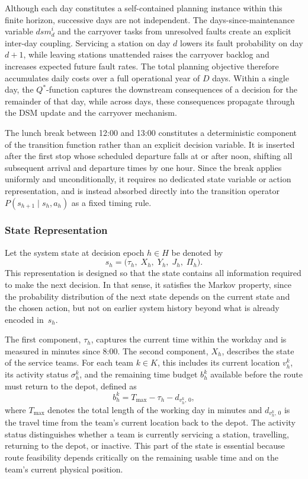 \documentclass[12pt,oneside]{article}
\begin{document}
Although each day constitutes a self-contained planning instance within this finite horizon, successive days are not independent. The days-since-maintenance variable $\mathit{dsm}_d^i$ and the carryover tasks from unresolved faults create an explicit inter-day coupling. Servicing a station on day $d$ lowers its fault probability on day $d+1$, while leaving stations unattended raises the carryover backlog and increases expected future fault rates. The total planning objective therefore accumulates daily costs over a full operational year of $D$ days. Within a single day, the $Q^*$-function captures the downstream consequences of a decision for the remainder of that day, while across days, these consequences propagate through the DSM update and the carryover mechanism.

The lunch break between 12:00 and 13:00 constitutes a deterministic component of the transition function rather than an explicit decision variable. It is inserted after the first stop whose scheduled departure falls at or after noon, shifting all subsequent arrival and departure times by one hour. Since the break applies uniformly and unconditionally, it requires no dedicated state variable or action representation, and is instead absorbed directly into the transition operator $P(s_{h+1} \mid s_h, a_h)$ as a fixed timing rule.
\subsubsection{State Representation}
Let the system state at decision epoch $h \in H$ be denoted by
\[
  s_h = \bigl(\tau_h,\; X_h,\; Y_h,\; J_h,\; \Pi_h\bigr).
\]
This representation is designed so that the state contains all information required to make the next decision. In that sense, it satisfies the Markov property, since the probability distribution of the next state depends on the current state and the chosen action, but not on earlier system history beyond what is already encoded in~$s_h$.

The first component, $\tau_h$, captures the current time within the workday and is measured in minutes since 8:00. The second component, $X_h$, describes the state of the service teams. For each team $k \in K$, this includes its current location $v_h^k$, its activity status $\sigma_h^k$, and the remaining time budget $b_h^k$ available before the route must return to the depot, defined as
\[
  b_h^k = T_{\max} - \tau_h - d_{v_h^k,\,0},
\]
where $T_{\max}$ denotes the total length of the working day in minutes and $d_{v_h^k,\,0}$ is the travel time from the team's current location back to the depot. The activity status distinguishes whether a team is currently servicing a station, travelling, returning to the depot, or inactive. This part of the state is essential because route feasibility depends critically on the remaining usable time and on the team’s current physical position.
\end{document}
